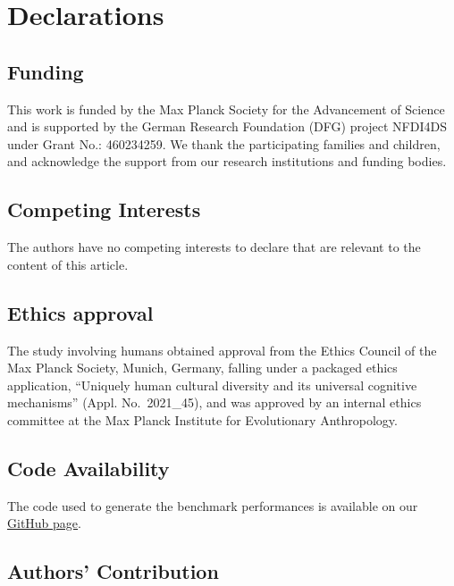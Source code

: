\documentclass[
  man,floatsintext]{apa6}
\begin{document}
\newpage

\section{Declarations}\label{declarations}

\subsection{Funding}\label{funding}

This work is funded by the Max Planck Society for the Advancement of Science and is supported by the German Research Foundation (DFG) project NFDI4DS under Grant No.: 460234259. We thank the participating families and children, and acknowledge the support from our research institutions and funding bodies.

\subsection{Competing Interests}\label{competing-interests}

The authors have no competing interests to declare that are relevant to the content of this article.

\subsection{Ethics approval}\label{ethics-approval}

The study involving humans obtained approval from the Ethics Council of the Max Planck Society, Munich, Germany, falling under a packaged ethics application, ``Uniquely human cultural diversity and its universal cognitive mechanisms'' (Appl. No.~2021\_45), and was approved by an internal ethics committee at the Max Planck Institute for Evolutionary Anthropology.

\subsection{Code Availability}\label{code-availability}

The code used to generate the benchmark performances is available on our \href{https://github.com/neleSuffo/ChildLens}{GitHub page}.

\subsection{Authors' Contribution}\label{authors-contribution}
\end{document}
